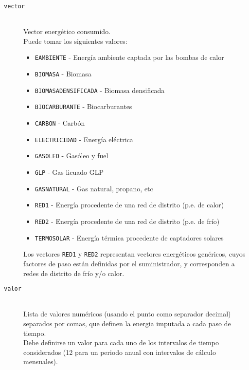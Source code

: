\documentclass[10pt,notitlepage,oneside,a4paper]{article}
\begin{document}
\begin{description}
    \item [\texttt{vector}] \hfill \\
          Vector energético consumido.\\
          Puede tomar los siguientes valores:
          \begin{multicols}{2}
              \begin{itemize}
                  \item \texttt{EAMBIENTE} - Energía ambiente captada por las bombas de calor
                  \item \texttt{BIOMASA} - Biomasa
                  \item \texttt{BIOMASADENSIFICADA} - Biomasa densificada
                  \item \texttt{BIOCARBURANTE} - Biocarburantes
                  \item \texttt{CARBON} - Carbón
                  \item \texttt{ELECTRICIDAD} - Energía eléctrica
                  \item \texttt{GASOLEO} - Gasóleo y fuel
                  \item \texttt{GLP} - Gas licuado GLP
                  \item \texttt{GASNATURAL} - Gas natural, propano, etc
                  \item \texttt{RED1} - Energía procedente de una red de distrito (p.e. de calor)
                  \item \texttt{RED2} - Energía procedente de una red de distrito (p.e. de frío)
                  \item \texttt{TERMOSOLAR} - Energía térmica procedente de captadores solares
              \end{itemize}
          \end{multicols}

          Los vectores \texttt{RED1} y \texttt{RED2} representan vectores energéticos genéricos, cuyos factores de paso están definidas por el suministrador, y corresponden a redes de distrito de frío y/o calor.

    \item [\texttt{valor}] \hfill \\
          Lista de valores numéricos (usando el punto como separador decimal) separados por comas, que definen la energia imputada a cada paso de tiempo.\\
          Debe definirse un valor para cada uno de los intervalos de tiempo considerados (12 para un periodo anual con intervalos de cálculo mensuales).


\end{description}
\end{document}
